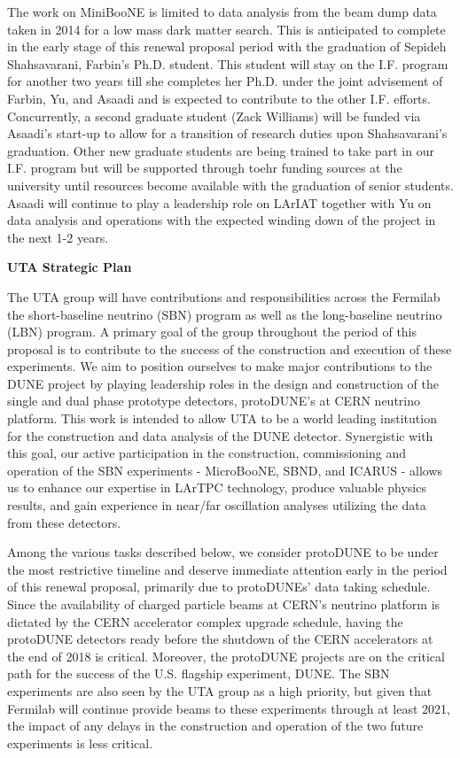 The work on MiniBooNE is limited to data analysis from the beam dump data taken in 2014 for a low mass dark matter search. This is anticipated to complete in the early stage of this renewal proposal period with the graduation of Sepideh Shahsavarani, Farbin’s Ph.D. student. This student will stay on the I.F. program for another two years till she completes her Ph.D. under the joint advisement of Farbin, Yu, and Asaadi and is expected to contribute to the other I.F. efforts. Concurrently, a second graduate student (Zack Williams) will be funded via Asaadi's start-up to allow for a transition of research duties upon Shahsavarani's graduation.  Other new graduate students are being trained to take part in our I.F. program but will be supported through toehr funding sources at the university until resources become available with the graduation of senior students.  Asaadi will continue to play a leadership role on LArIAT together with Yu on data analysis and operations with the expected winding down of the project in the next 1-2 years.

\begin{center}
\textbf{ \Large{UTA Strategic Plan} }
\end{center} 

The UTA group will have contributions and responsibilities across the Fermilab the short-baseline neutrino (SBN) program as well as the long-baseline neutrino (LBN) program. A primary goal of the group throughout the period of this proposal is to contribute to the success of the construction and execution of these experiments. We aim to position ourselves to make major contributions to the DUNE project by playing leadership roles in the design and construction of the single and dual phase prototype detectors, protoDUNE's at CERN neutrino platform. This work is intended to allow UTA to be a world leading institution for the construction and data analysis of the DUNE detector. Synergistic with this goal, our active participation in the construction, commissioning and operation of the SBN experiments - MicroBooNE, SBND, and ICARUS - allows us to enhance our expertise in LArTPC technology, produce valuable physics results, and gain experience in near/far oscillation analyses utilizing the data from these detectors.

Among the various tasks described below, we consider protoDUNE to be under the most restrictive timeline and deserve immediate  attention early in the period of this renewal proposal, primarily due to protoDUNEs' data taking schedule. Since the availability of charged particle beams at CERN's neutrino platform is dictated by the CERN accelerator complex upgrade schedule, having the protoDUNE detectors ready before the shutdown of the CERN accelerators at the end of 2018 is critical. Moreover, the protoDUNE projects are on the critical path for the success of the U.S. flagship experiment, DUNE. The SBN experiments are also seen by the UTA group as a high priority, but given that Fermilab will continue provide beams to these experiments through at least 2021, the impact of any delays in the construction and operation of the two future experiments is less critical.

